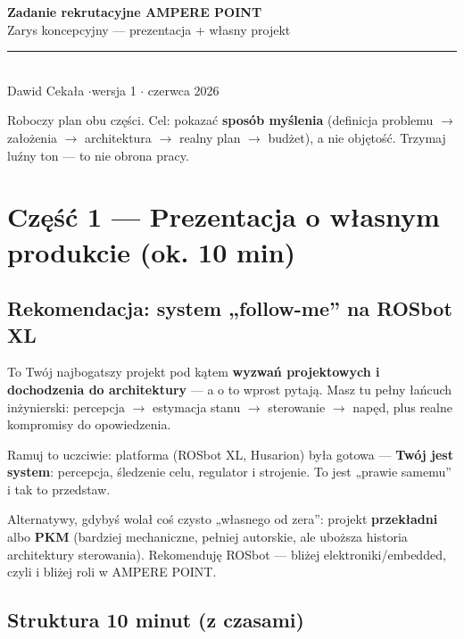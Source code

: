 \documentclass[11pt]{article}
\newcommand{\ra}{$\rightarrow$}
\begin{document}
{\sffamily\bfseries\color{navy}\LARGE Zadanie rekrutacyjne AMPERE POINT}\\[2pt]
{\sffamily\large\color{navy} Zarys koncepcyjny --- prezentacja + własny projekt}\\[4pt]
{\color{rulegrey}\rule{\linewidth}{1pt}}\\[2pt]
{\sffamily\small Dawid Cekała \quad$\cdot$\quad wersja 1 \quad$\cdot$ czerwca 2026}

\vspace{0.6em}

Roboczy plan obu części. Cel: pokazać \textbf{sposób myślenia} (definicja problemu \ra{} założenia \ra{} architektura \ra{} realny plan \ra{} budżet), a nie objętość. Trzymaj luźny ton --- to nie obrona pracy.

\section{Część 1 --- Prezentacja o własnym produkcie (ok. 10 min)}

\subsection{Rekomendacja: system „follow-me” na ROSbot XL}

To Twój najbogatszy projekt pod kątem \textbf{wyzwań projektowych i dochodzenia do architektury} --- a o to wprost pytają. Masz tu pełny łańcuch inżynierski: percepcja \ra{} estymacja stanu \ra{} sterowanie \ra{} napęd, plus realne kompromisy do opowiedzenia.

Ramuj to uczciwie: platforma (ROSbot XL, Husarion) była gotowa --- \textbf{Twój jest system}: percepcja, śledzenie celu, regulator i strojenie. To jest „prawie samemu” i tak to przedstaw.

Alternatywy, gdybyś wolał coś czysto „własnego od zera”: projekt \textbf{przekładni} albo \textbf{PKM} (bardziej mechaniczne, pełniej autorskie, ale uboższa historia architektury sterowania). Rekomenduję ROSbot --- bliżej elektroniki/embedded, czyli i bliżej roli w AMPERE POINT.

\subsection{Struktura 10 minut (z czasami)}
\end{document}
